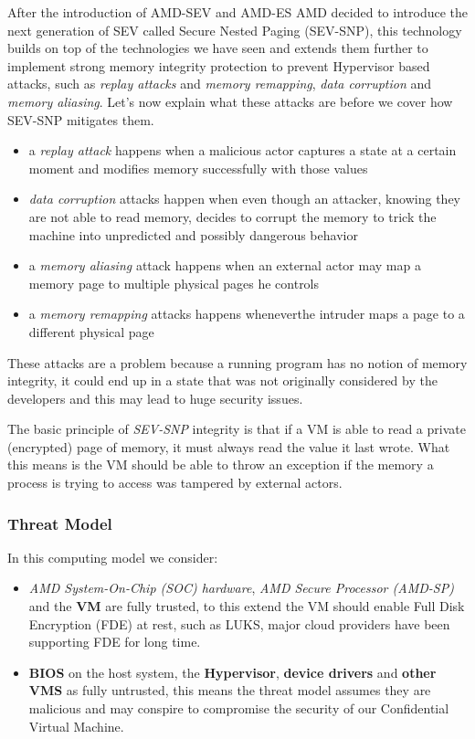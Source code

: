 \documentclass[twocolumn]{article}
\begin{document}
After the introduction of AMD-SEV and AMD-ES AMD decided to introduce the next generation of SEV called Secure Nested Paging (SEV-SNP), this technology builds on top of the technologies we have seen and extends them further to implement strong memory integrity protection to prevent Hypervisor based attacks, such as \textit{replay attacks} and \textit{memory remapping}, \textit{data corruption} and \textit{memory aliasing}.
Let's now explain what these attacks are before we cover how SEV-SNP mitigates them.

\begin{itemize}
    \item a \textit{replay attack} happens when a malicious actor captures a state at a certain moment and modifies memory successfully with those values
    \item \textit{data corruption} attacks happen when even though an attacker, knowing they are not able to read memory, decides to corrupt the memory to trick the machine into unpredicted and possibly dangerous behavior
    \item a \textit{memory aliasing} attack happens when an external actor may map a memory page to multiple physical pages he controls
    \item a \textit{memory remapping} attacks happens wheneverthe intruder maps a page to a different physical page
\end{itemize}

These attacks are a problem because a running program has no notion of memory integrity, it could end up in a state that was not originally considered by the developers and this may lead to huge security issues.

The basic principle of \textit{SEV-SNP} integrity is that if a VM is able to read a private (encrypted) page of memory, it must always read the value it last wrote. What this means is the VM should be able to throw an exception if the memory a process is trying to access was tampered by external actors.

\subsubsection{Threat Model}
In this computing model we consider:
\begin{itemize}
    \item \textit{AMD System-On-Chip (SOC) hardware}, \textit{AMD Secure Processor (AMD-SP)} and the \textbf{VM} are fully trusted, to this extend the VM should enable Full Disk Encryption (FDE) at rest, such as LUKS, major cloud providers have been supporting FDE for long time.
    \item \textbf{BIOS} on the host system, the \textbf{Hypervisor}, \textbf{device drivers} and \textbf{other VMS} as fully untrusted, this means the threat model assumes they are malicious and may conspire to compromise the security of our Confidential Virtual Machine.
\end{itemize}
\end{document}
